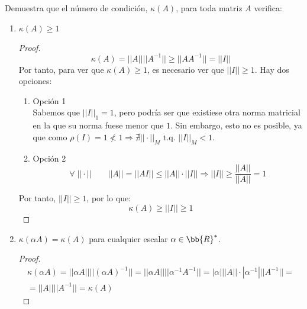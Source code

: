 \begin{ejercicio}
    Demuestra que el número de condición, $\kappa(A)$, para toda matriz $A$ verifica:
    \begin{enumerate}
        \item $\kappa(A)\geq 1$
        \begin{proof}
            \begin{equation*}
                \kappa(A) = ||A||||A^{-1}|| \geq ||AA^{-1}|| = ||I||
            \end{equation*}
            Por tanto, para ver que $\kappa(A)\geq 1$, es necesario ver que $||I|| \geq 1$. Hay dos opciones:
            \begin{enumerate}
                \item Opción 1\\
                Sabemos que $||I||_1 = 1$, pero podría ser que existiese otra norma matricial en la que su norma fuese menor que $1$. Sin embargo, esto no es posible, ya que como $\rho (I) = 1 \nless 1 \Longrightarrow \nexists ||\cdot||_M \text{ t.q. } ||I||_M < 1$.

                \item Opción 2\\
                \begin{equation*}
                    \forall\;||\cdot|| \qquad ||A||=||AI|| \leq ||A||\cdot ||I|| \Longrightarrow ||I||\geq \frac{||A||}{||A||} = 1
                \end{equation*}
            \end{enumerate}
            
            Por tanto, $||I||\geq 1$, por lo que:
            $$\kappa(A) \geq ||I|| \geq 1$$
        \end{proof}

        \item $\kappa(\alpha A) = \kappa(A)$ para cualquier escalar $\alpha \in \bb{R}^\ast$.
        \begin{proof}
            \begin{multline*}
                \kappa(\alpha A) = ||\alpha A||||(\alpha A)^{-1}|| = ||\alpha A||||\alpha^{-1} A^{-1}|| = |\alpha|||A||\cdot |\alpha^{-1}|||A^{-1}|| =\\= ||A||||A^{-1}|| = \kappa(A)
            \end{multline*}
        \end{proof}
    \end{enumerate}
\end{ejercicio}

